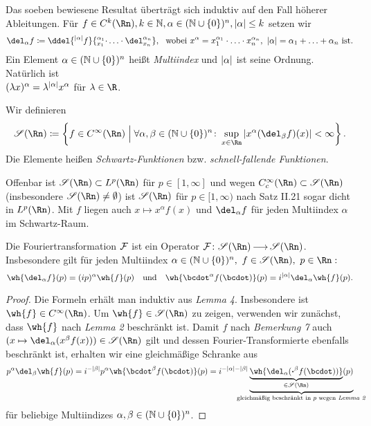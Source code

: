 \documentclass[skript.tex]{subfiles}
\begin{document}
\begin{notat}
	Das soeben bewiesene Resultat überträgt sich induktiv auf den Fall höherer Ableitungen. Für $f\in C^k(\Rn), k\in\N, \alpha \in (\N \cup \cbr{0})^n, \abs{\alpha} \leq k$ setzen wir
	\[
		\del_\alpha f \ceq \ddel{^{\abs{\alpha}} f}{^{\alpha_1}_{x_1} \cdot \dotsc \cdot \del_{x_n}^{\alpha_n}},\ \text{ wobei } x^\alpha = x_1^{\alpha_1} \cdot \dotsc \cdot x_n^{\alpha_n},\ \abs{\alpha} = \alpha_1 + \dotsc + \alpha_n \text{ ist.} 
	\]
	Ein Element $\alpha \in (\mathbb{N} \cup \left\{0\right\})^n$ heißt \textit{Multiindex} und $\left| \alpha \right|$ ist seine Ordnung. Natürlich ist \\$(\lambda x)^\alpha = \lambda^{\left| \alpha \right|} x^\alpha$ für $\lambda \in \R$.
\end{notat}

\begin{defin}
	Wir definieren
	\[
		\ms{S}(\Rn) \ceq \cbr{f \in C^\infty(\Rn) \midd \forall \alpha, \beta \in (\N \cup \cbr{0})^n \colon \sup_{x\in\Rn} \abs{x^\alpha(\del_\beta f) (x)} < \infty}.
	\]
	Die Elemente heißen \textit{Schwartz-Funktionen} bzw. \textit{schnell-fallende Funktionen}.
\end{defin}

\begin{bem}
	Offenbar ist $\ms{S}(\Rn) \sbs L^p(\Rn)$ für $p\in [1,\infty]$ und wegen $C^\infty_c (\Rn) \sbs \ms{S}(\Rn)$ (insbesondere $\ms{S}(\Rn) \neq \es$) ist $\ms{S}(\Rn)$ für $p\in[1,\infty)$ nach \textup{Satz II.21} sogar dicht in $L^p(\Rn)$. Mit $f$ liegen auch $x\mapsto x^\alpha f(x)$ und $\del_\alpha f$ für jeden Multiindex $\alpha$ im Schwartz-Raum. 
\end{bem}
	
\begin{lem}
	Die Fouriertransformation $\mathcal{F}$ ist ein Operator $\mc{F} \colon \ms{S}(\Rn) \lra \ms{S}(\Rn)$. Insbesondere gilt für jeden Multiindex $\alpha \in (\N \cup \cbr{0})^n,\ f \in \ms{S}(\Rn),\ p\in \Rn:$
	\[
		\wh{\del_\alpha f} (p) = (ip)^\alpha \wh{f}(p) \quad\text{und}\quad \wh{\bcdot^\alpha f(\bcdot)} (p) = i^{\abs{\alpha}} \del_\alpha \wh{f} (p). 
	\]
\end{lem}

\begin{proof}
	Die Formeln erhält man induktiv aus \textit{Lemma 4}. Insbesondere ist $\wh{f} \in C^\infty (\Rn)$. Um $\wh{f} \in \ms{S}(\Rn)$ zu zeigen, verwenden wir zunächst, dass $\wh{f}$ nach \textit{Lemma 2} beschränkt ist. Damit $f$ nach \textit{Bemerkung 7} auch $(x\mapsto \del_\alpha (x^\beta f(x))) \in \ms{S}(\Rn)$ gilt und dessen Fourier-Transformierte ebenfalls beschränkt ist, erhalten wir eine gleichmäßige Schranke aus 
	\[
		p^\alpha \del_\beta \wh{f} (p) = i^{- \abs{\beta}} p^\alpha \wh{\bcdot^\beta f(\bcdot)} (p) = i^{- \abs{\alpha} - \abs{\beta}} \underbrace{\underbrace{\wh{\del_\alpha ( \boldsymbol{\cdot}^\beta f(\bcdot))}}_{\in \ms{S}(\Rn)} (p)}_{\mathclap{\text{gleichmäßig beschränkt in $p$ wegen \textit{Lemma 2}}}}
	\]
	für beliebige Multiindizes $\alpha, \beta \in (\mathbb{N} \cup \left\{0\right\})^n$.
\end{proof}
\end{document}
